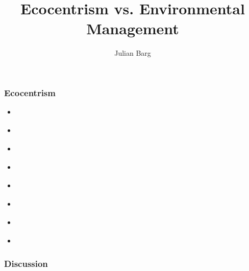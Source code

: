 \documentclass{article}
\title{Ecocentrism vs. Environmental Management}
\author{Julian Barg}
\begin{document}
	\maketitle



	

	

	

	\subsubsection*{Ecocentrism}

	\begin{itemize}
		\item \citet{Purser1995}
		\item \citet{Shrivastava1995}
		\item \citet{Banerjee2003}
		\item \citet{Springett2003}
		\item \citet{Milne2006}
		\item \citet{Banerjee2011}
		\item \citet{Hoffman2015}
		\item \citet{Ergene2020}
	\end{itemize}


	\subsubsection*{Discussion}

\end{document}
